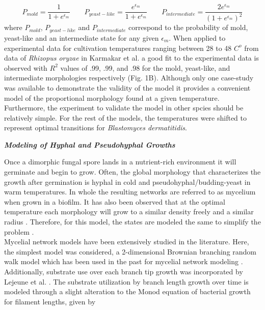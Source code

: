 \documentclass[preprint,12pt]{elsarticle}
\begin{document}
\begin{equation}
P_{mold} = \frac{1}{1+e^{\epsilon_m}}
\qquad
P_{yeast-like} = \frac{e^{\epsilon_m}}{1+e^{\epsilon_m}}
\qquad
P_{intermediate} = \frac{2e^{\epsilon_m}}{(1+e^{\epsilon_m})^{2}}
\end{equation}
%
where $P_{mold}$, $P_{yeast-like}$ and $P_{intermediate}$ correspond to the probability of mold, yeast-like and an intermediate state for any given $\epsilon_{m}$. When applied to experimental data for cultivation temperatures ranging between 28 to 48 $C^{o}$ from data of \textit{Rhizopus oryzae} in Karmakar et al. \citep{Karmakar2012-le} a good fit to the experimental data is observed with $R^{2}$ values of .99, .99, and .98 for the mold, yeast-like, and intermediate morphologies respectively (Fig. 1B). Although only one case-study was available to demonstrate the validity of the model it provides a convenient model of the proportional morphology found at a given temperature. Furthermore, the experiment to validate the model in other spcies should be relatively simple. For the rest of the models, the temperatures were shifted to represent optimal transitions for \textit{Blastomyces dermatitidis}. \newline

\textbf{\textit{Modeling of Hyphal and Pseudohyphal Growths}}
\newline

Once a dimorphic fungal spore lands in a nutrient-rich environment it will germinate and begin to grow. Often, the global morphology that characterizes the growth after germination is hyphal in cold and pseudohyphal/budding-yeast in warm temperatures. In whole the resulting networks are referred to as mycelium when grown in a biofilm. It has also been observed that at the optimal temperature each morphology will grow to a similar density freely and a similar radius \citep{Nemecek2006-ff}. Therefore, for this model, the states are modeled the same to simplify the problem \citep{Klein2007-ge}. \\

Mycelial network models have been extensively studied in the literature. Here, the simplest model was considered, a 2-dimensional Brownian branching random walk model \citep{Fisher1937-lz} which has been used in the past for mycelial network modeling \citep{Carver2008-bq}. Additionally, substrate use over each branch tip growth was incorporated by Lejeune et al. \citep{Lejeune1995-it}. The substrate utilization by branch length growth over time is modeled through a slight alteration to the Monod equation of bacterial growth \citep{Monod1949-rl} for filament lengths, given by
\end{document}
